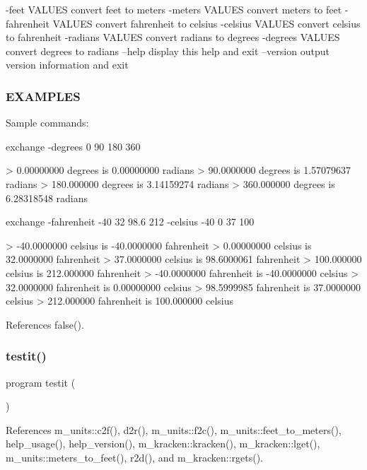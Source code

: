 -\/feet V\+A\+L\+U\+ES convert feet to meters -\/meters V\+A\+L\+U\+ES convert meters to feet -\/fahrenheit V\+A\+L\+U\+ES convert fahrenheit to celsius -\/celsius V\+A\+L\+U\+ES convert celsius to fahrenheit -\/radians V\+A\+L\+U\+ES convert radians to degrees -\/degrees V\+A\+L\+U\+ES convert degrees to radians --help display this help and exit --version output version information and exit

\subsubsection*{E\+X\+A\+M\+P\+L\+ES}

\begin{DoxyVerb} Sample commands:

  exchange -degrees 0 90 180 360

  > 0.00000000      degrees is    0.00000000      radians
  > 90.0000000      degrees is    1.57079637      radians
  > 180.000000      degrees is    3.14159274      radians
  > 360.000000      degrees is    6.28318548      radians

  exchange -fahrenheit -40 32 98.6 212 -celsius -40 0 37 100

  > -40.0000000      celsius is   -40.0000000      fahrenheit
  >  0.00000000      celsius is    32.0000000      fahrenheit
  >  37.0000000      celsius is    98.6000061      fahrenheit
  >  100.000000      celsius is    212.000000      fahrenheit
  > -40.0000000      fahrenheit is   -40.0000000      celsius
  >  32.0000000      fahrenheit is    0.00000000      celsius
  >  98.5999985      fahrenheit is    37.0000000      celsius
  >  212.000000      fahrenheit is    100.000000      celsius \end{DoxyVerb}
 

References false().

\mbox{\label{exchange_8f90_a483d2219923eccf493a883fceee5a424}} 
\subsubsection{\texorpdfstring{testit()}{testit()}}
{\footnotesize\ttfamily program testit (\begin{DoxyParamCaption}{ }\end{DoxyParamCaption})}



References m\+\_\+units\+::c2f(), d2r(), m\+\_\+units\+::f2c(), m\+\_\+units\+::feet\+\_\+to\+\_\+meters(), help\+\_\+usage(), help\+\_\+version(), m\+\_\+kracken\+::kracken(), m\+\_\+kracken\+::lget(), m\+\_\+units\+::meters\+\_\+to\+\_\+feet(), r2d(), and m\+\_\+kracken\+::rgets().

